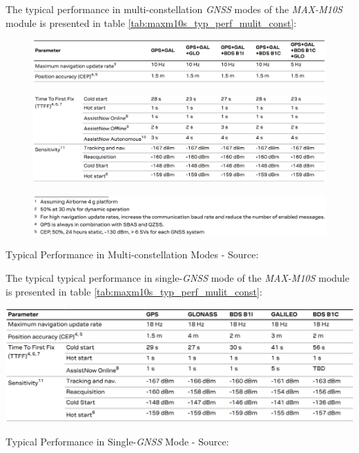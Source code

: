 \documentclass[report.tex]{subfiles}
\begin{document}
\pagebreak

The typical performance in multi-constellation \textit{GNSS} modes of the \textit{MAX-M10S} module is presented in table \ref{tab:maxm10s_typ_perf_mulit_const}:

\begin{table}[H]
\centering
\begin{subfigure}{\textwidth}
	\centering
	\includegraphics[width=1\textwidth]{Include/Figure/comp/maxm10s_typ_perf_mulit_const2.png}
\end{subfigure}
\begin{subfigure}{\textwidth}
	\centering
	\includegraphics[width=1\textwidth]{Include/Figure/comp/maxm10s_typ_perf_mulit_const1.png}
\end{subfigure}
\begin{subfigure}{\textwidth}
	\centering
	\includegraphics[width=1\textwidth]{Include/Figure/comp/maxm10s_typ_perf_mulit_const3.png}
\end{subfigure}
\caption{Typical Performance in Multi-constellation Modes - Source: \cite{MAXM10S}}
\label{tab:maxm10s_typ_perf_mulit_const}
\end{table}

The typical typical performance in single-\textit{GNSS} mode of the \textit{MAX-M10S} module is presented in table \ref{tab:maxm10s_typ_perf_mulit_const}:

\begin{table}[H]
	\centering
	\includegraphics[width=1\textwidth]{Include/Figure/comp/maxm10s_typ_perf_single_gnss.png}
\caption{Typical Performance in Single-\textit{GNSS} Mode - Source: \cite{MAXM10S}}
\label{tab:maxm10s_typ_perf_single_gnss}
\end{table}
\end{document}

